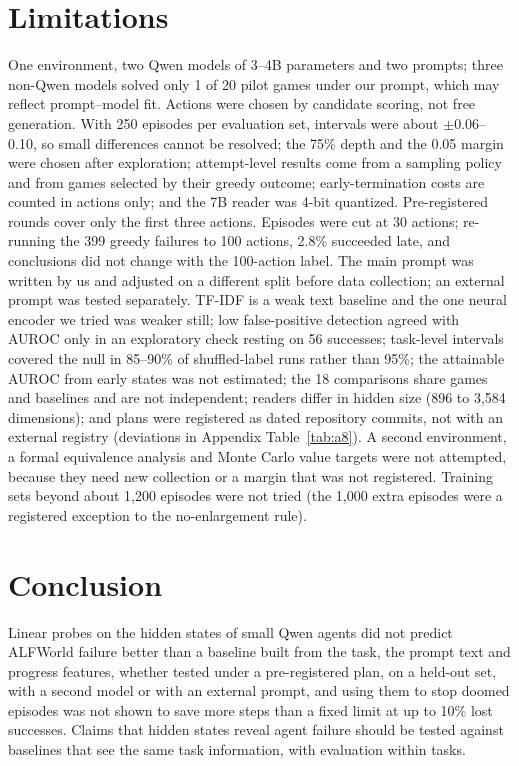 \documentclass[10pt]{article}
\begin{document}
\section{Limitations}\label{sec:limits}
One environment, two Qwen models of 3--4B parameters and two prompts; three non-Qwen models solved only 1 of 20 pilot games under our prompt, which may reflect prompt--model fit. Actions were chosen by candidate scoring, not free generation.
With 250 episodes per evaluation set, intervals were about $\pm$0.06--0.10, so small differences cannot be resolved; the 75\% depth and the 0.05 margin were chosen after exploration; attempt-level results come from a sampling policy and from games selected by their greedy outcome; early-termination costs are counted in actions only; and the 7B reader was 4-bit quantized.
Pre-registered rounds cover only the first three actions. Episodes were cut at 30 actions; re-running the 399 greedy failures to 100 actions, 2.8\% succeeded late, and conclusions did not change with the 100-action label. The main prompt was written by us and adjusted on a different split before data collection; an external prompt was tested separately.
TF-IDF is a weak text baseline and the one neural encoder we tried was weaker still; low false-positive detection agreed with AUROC only in an exploratory check resting on 56 successes; task-level intervals covered the null in 85--90\% of shuffled-label runs rather than 95\%; the attainable AUROC from early states was not estimated; the 18 comparisons share games and baselines and are not independent; readers differ in hidden size (896 to 3,584 dimensions); and plans were registered as dated repository commits, not with an external registry (deviations in Appendix Table~\ref{tab:a8}). A second environment, a formal equivalence analysis and Monte Carlo value targets were not attempted, because they need new collection or a margin that was not registered. Training sets beyond about 1,200 episodes were not tried (the 1,000 extra episodes were a registered exception to the no-enlargement rule).

\section{Conclusion}
Linear probes on the hidden states of small Qwen agents did not predict ALFWorld failure better than a baseline built from the task, the prompt text and progress features, whether tested under a pre-registered plan, on a held-out set, with a second model or with an external prompt, and using them to stop doomed episodes was not shown to save more steps than a fixed limit at up to 10\% lost successes.
Claims that hidden states reveal agent failure should be tested against baselines that see the same task information, with evaluation within tasks.
\end{document}
